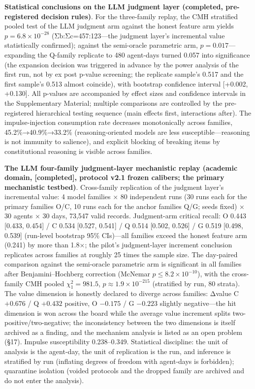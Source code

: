 \documentclass[
  11pt]{article}
\begin{document}
\textbf{Statistical conclusions on the LLM judgment layer (completed,
pre-registered decision rules)}. For the three-family replay, the CMH
stratified pooled test of the LLM judgment arm against the honest
feature arm yields \(p=6.8\times10^{-28}\) (Σb:Σc=457:123---the judgment
layer's incremental value statistically confirmed); against the
semi-oracle parametric arm, \(p=0.017\)---expanding the Q-family
replicate to 480 agent-days turned 0.057 into significance (the
expansion decision was triggered in advance by the power analysis of the
first run, not by ex post p-value screening; the replicate sample's
0.517 and the first sample's 0.513 almost coincide), with bootstrap
confidence interval {[}+0.002, +0.130{]}. All p-values are accompanied
by effect sizes and confidence intervals in the Supplementary Material;
multiple comparisons are controlled by the pre-registered hierarchical
testing sequence (main effects first, interactions after). The
impulse-injection consumption rate decreases monotonically across
families, 45.2\%→40.9\%→33.2\% (reasoning-oriented models are less
susceptible---reasoning is not immunity to salience), and explicit
blocking of breaking items by constitutional reasoning is visible across
families.

\textbf{The LLM four-family judgment-layer mechanistic replay (academic
domain, {[}completed{]}, protocol v2.1 frozen calibers; the primary
mechanistic testbed)}. Cross-family replication of the judgment layer's
incremental value: 4 model families × 80 independent runs (30 runs each
for the primary families O/C, 10 runs each for the anchor families Q/G;
seeds fixed) × 30 agents × 30 days, 73,547 valid records. Judgment-arm
critical recall: O 0.443 {[}0.433, 0.454{]} / C 0.534 {[}0.527, 0.541{]}
/ Q 0.514 {[}0.502, 0.526{]} / G 0.519 {[}0.498, 0.539{]} (run-level
bootstrap 95\% CIs)---all families exceed the honest feature arm (0.241)
by more than 1.8×; the pilot's judgment-layer increment conclusion
replicates across families at roughly 25 times the sample size. The
day-paired comparison against the semi-oracle parametric arm is
significant in all families after Benjamini--Hochberg correction
(McNemar \(p\le 8.2\times10^{-10}\)), with the cross-family CMH pooled
\(\chi^2_1=981.5\), \(p\approx1.9\times10^{-215}\) (stratified by run,
80 strata). The value dimension is honestly declared to diverge across
families: Δvalue C \(+0.676\) / Q \(+0.432\) positive, O \(-0.175\) / G
\(-0.223\) slightly negative---the hit dimension is won across the board
while the average value increment splits two-positive/two-negative; the
inconsistency between the two dimensions is itself archived as a
finding, and the mechanism analysis is listed as an open problem (§17).
Impulse susceptibility 0.238--0.349. Statistical discipline: the unit of
analysis is the agent-day, the unit of replication is the run, and
inference is stratified by run (inflating degrees of freedom with
agent-days is forbidden); quarantine isolation (voided protocols and the
dropped family are archived and do not enter the analysis).
\end{document}
